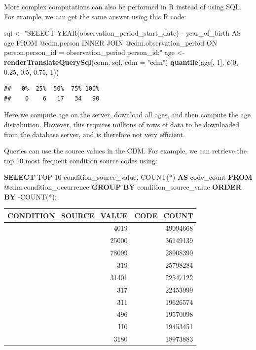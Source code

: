 \documentclass[11pt]{book}
\newenvironment{Shaded}{\begin{snugshade}}{\end{snugshade}}
\newcommand{\KeywordTok}[1]{\textcolor[rgb]{0.13,0.29,0.53}{\textbf{#1}}}
\newcommand{\DataTypeTok}[1]{\textcolor[rgb]{0.13,0.29,0.53}{#1}}
\newcommand{\DecValTok}[1]{\textcolor[rgb]{0.00,0.00,0.81}{#1}}
\newcommand{\FloatTok}[1]{\textcolor[rgb]{0.00,0.00,0.81}{#1}}
\newcommand{\StringTok}[1]{\textcolor[rgb]{0.31,0.60,0.02}{#1}}
\newcommand{\FunctionTok}[1]{\textcolor[rgb]{0.00,0.00,0.00}{#1}}
\newcommand{\NormalTok}[1]{#1}
\begin{document}
More complex computations can also be performed in R instead of using
SQL. For example, we can get the same answer using this R code:

\begin{Shaded}
\begin{Highlighting}[]
\NormalTok{sql <-}\StringTok{ "SELECT YEAR(observation_period_start_date) -}
\StringTok{               year_of_birth AS age}
\StringTok{FROM @cdm.person}
\StringTok{INNER JOIN @cdm.observation_period}
\StringTok{  ON person.person_id = observation_period.person_id;"}
\NormalTok{age <-}\StringTok{ }\KeywordTok{renderTranslateQuerySql}\NormalTok{(conn, sql, }\DataTypeTok{cdm =} \StringTok{"cdm"}\NormalTok{)}
\KeywordTok{quantile}\NormalTok{(age[, }\DecValTok{1}\NormalTok{], }\KeywordTok{c}\NormalTok{(}\DecValTok{0}\NormalTok{, }\FloatTok{0.25}\NormalTok{, }\FloatTok{0.5}\NormalTok{, }\FloatTok{0.75}\NormalTok{, }\DecValTok{1}\NormalTok{))}
\end{Highlighting}
\end{Shaded}

\begin{verbatim}
##   0%  25%  50%  75% 100% 
##    0    6   17   34   90
\end{verbatim}

Here we compute age on the server, download all ages, and then compute
the age distribution. However, this requires millions of rows of data to
be downloaded from the database server, and is therefore not very
efficient.

Queries can use the source values in the CDM. For example, we can
retrieve the top 10 most frequent condition source codes using:

\begin{Shaded}
\begin{Highlighting}[]
\KeywordTok{SELECT}\NormalTok{ TOP }\DecValTok{10}\NormalTok{ condition_source_value, }
  \FunctionTok{COUNT}\NormalTok{(*) }\KeywordTok{AS}\NormalTok{ code_count}
\KeywordTok{FROM}\NormalTok{ @cdm.condition_occurrence}
\KeywordTok{GROUP} \KeywordTok{BY}\NormalTok{ condition_source_value}
\KeywordTok{ORDER} \KeywordTok{BY}\NormalTok{ -COUNT(*);}
\end{Highlighting}
\end{Shaded}

\begin{longtable}[]{@{}rr@{}}
\toprule
CONDITION\_SOURCE\_VALUE & CODE\_COUNT\tabularnewline
\midrule
\endhead
4019 & 49094668\tabularnewline
25000 & 36149139\tabularnewline
78099 & 28908399\tabularnewline
319 & 25798284\tabularnewline
31401 & 22547122\tabularnewline
317 & 22453999\tabularnewline
311 & 19626574\tabularnewline
496 & 19570098\tabularnewline
I10 & 19453451\tabularnewline
3180 & 18973883\tabularnewline
\bottomrule
\end{longtable}
\end{document}
